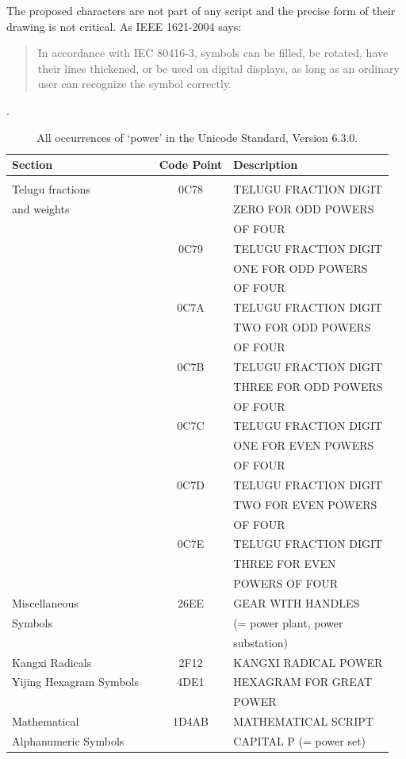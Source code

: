 \documentclass[10pt,a4paper]{article}
\begin{document}
The proposed characters are not part of any script and the precise form of
their drawing is not critical. As IEEE 1621-2004 says:

\begin{quote}
In accordance with IEC 80416-3, symbols can be filled, be rotated, have their lines
thickened, or be used on digital displays, as long as an ordinary user can recognize
the symbol correctly.
\end{quote}

\noindent \cite[\S 4.3]{IEEE1621}.

\begin{table}[htbp]
	\centering
	\begin{tabular}{lcl}
		\textbf{Section} & \textbf{Code Point} & \textbf{Description} \\
		\hline \\
		Telugu fractions \
			& 0C78 & TELUGU FRACTION DIGIT \\
		and weights	& & ZERO FOR ODD POWERS \\
				& & OF FOUR \\
			& 0C79 & TELUGU FRACTION DIGIT \\
				& & ONE FOR ODD POWERS \\
				& & OF FOUR \\
			& 0C7A & TELUGU FRACTION DIGIT \\
				& & TWO FOR ODD POWERS \\
				& & OF FOUR \\
			& 0C7B & TELUGU FRACTION DIGIT \\
				& & THREE FOR ODD POWERS \\
				& & OF FOUR \\
			& 0C7C & TELUGU FRACTION DIGIT \\
				& & ONE FOR EVEN POWERS \\
				& & OF FOUR \\
			& 0C7D & TELUGU FRACTION DIGIT \\
				& & TWO FOR EVEN POWERS \\
				& & OF FOUR \\
			& 0C7E & TELUGU FRACTION DIGIT \\
				& & THREE FOR EVEN \\
				& & POWERS OF FOUR \\
		\hline
		Miscellaneous \
			& 26EE & GEAR WITH HANDLES \\
		Symbols & & (= power plant, power \\
				& & substation) \\
		\hline
		Kangxi Radicals \
			& 2F12 & KANGXI RADICAL POWER \\
		\hline
		Yijing Hexagram Symbols \
			& 4DE1 & HEXAGRAM FOR GREAT \\
				& & POWER \\
		\hline
		Mathematical \
			& 1D4AB & MATHEMATICAL SCRIPT \\
		Alphanumeric Symbols & & CAPITAL P (= power set) \\
    \end{tabular}
    \caption{All occurrences of `power' in the Unicode Standard, Version 6.3.0.}
    \label{table:power} %
\end{table}
\end{document}
